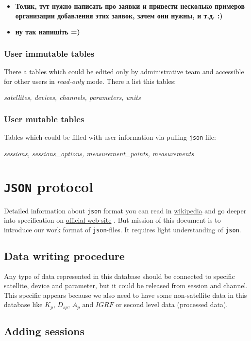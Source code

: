 \documentclass{article}
\begin{document}
    \begin{itemize}
        \item \textbf{Толик, тут нужно написать про заявки и привести несколько примеров организации добавления этих заявок, зачем они нужны, и т.д. :)}
        \item \textbf{ну так напишіть =)}
    \end{itemize}
    
    \subsubsection{User immutable tables}
    \label{sec:immutable_tables}
    There a tables which could be edited only by administrative team and accessible for other users in \textit{read-only} mode. There a list this tables:
    
    \textit{satellites, devices, channels, parameters, units}
    
    \subsubsection{User mutable tables}
    Tables which could be filled with user information via pulling \texttt{json}-file:
    
    \textit{sessions, sessions{\_}options, measurement{\_}points, measurements}

    \section{\texttt{JSON} protocol}
    Detailed information about \texttt{json} format you can read in
\href{http://en.wikipedia.org/wiki/JSON}{wikipedia}
and go deeper into specification on
\href{http://www.json.org/}{official web-site}
. But mission of this document is to introduce our work format of \texttt{json}-files. It requires light understanding of \texttt{json}.
    
    \subsection{Data writing procedure}
    Any type of data represented in this database should be connected to specific satellite, device and parameter, but it could be released from session and channel. This specific appears because we also need to have some non-satellite data in this database like $K_p$, $D_{sp}$, $A_p$ and $IGRF$ or second level data (processed data).

    \subsection{Adding sessions}
    
\end{document}
